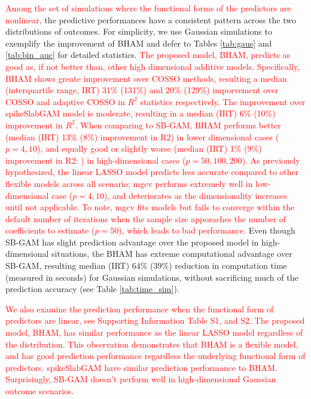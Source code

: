 \documentclass[AMA,STIX1COL,]{WileyNJD-v2}
\begin{document}
\textcolor{red}{Among the set of simulations where the functional forms of the predictors are nonlinear,}
the predictive performances have a consistent pattern across the two
distributions of outcomes. For simplicity, we use Gaussian simulations
to exemplify the improvement of BHAM and defer to Tables \ref{tab:gaus}
and \ref{tab:bin_auc} for detailed statistics.
\textcolor{red}{The proposed model, BHAM, predicts as good as, if not better than, other high dimensional additive models. Specifically, BHAM shows greate improvement over COSSO methods, resulting a median (interquartile range, IRT) 31\% (131\%) and 20\% (129\%) imporvement over COSSO and adaptive COSSO in $R^2$ statistics respectively. The improvement over spikeSlabGAM model is moderate, resulting in a median (IRT) 6\% (10\%) improvement in $R^2$. When comparing to SB-GAM, BHAM performs better (median (IRT) 13\% (8\%) improvement in R2) in lower dimensional cases ($p=4,10$), and equally good or slightly worse (median (IRT) 1\% (9\%) improvement in R2: ) in high-dimensional cases ($p=50,100, 200$). As previously hypothesized, the linear LASSO model predicts less accurate compared to other flexible models across all scenario; mgcv performs extremely well in low-dimensional case ($p = 4, 10$), and deteriorates as the dimensionality increases until not applicable. To note, mgcv fits models but fails to converge within the default number of iterations when the sample size apporaches the number of coefficients to estimate ($p=50$), which leads to bad performance.}
Even though SB-GAM has slight prediction advantage over the proposed
model in high-dimensional situations, the BHAM has extreme computational
advantage over SB-GAM, resulting median (IRT) 64\% (39\%) reduction in
computation time (measured in seconds) for Gaussian simulations, without
sacrificing much of the prediction accuracy (see Table
\ref{tab:time_sim}).

\textcolor{red}{We also examine the prediction performance when the functional form of predictors are linear, see Supporting Information Table S1, and S2. The proposed model, BHAM, has similar performance as the linear LASSO model regardless of the distribution. This observation demonstrates that BHAM is a flexible model, and has good prediction performance regardless the underlying functional form of predictors. spikeSlabGAM have similar prediction performance to BHAM. Surprisingly, SB-GAM doesn't perform well in high-dimensional Gaussian outcome scenarios.}
\end{document}
